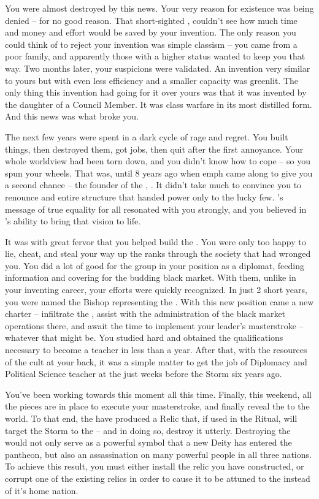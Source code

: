 \documentclass[char]{GL2020}
\begin{document}
You were almost destroyed by this news. Your very reason for existence was being denied -- for no good reason. That short-sighted \cAntiChup{\cleric}, \cAntiChup{} couldn’t see how much time and money and effort would be saved by your invention. The only reason you could think of to reject your invention was simple classism -- you came from a poor family, and apparently those with a higher status wanted to keep you that way. Two months later, your suspicions were validated. An invention very similar to yours but with even less efficiency and a smaller capacity was greenlit. The only thing this invention had going for it over yours was that it was invented by the daughter of a Council Member. It was class warfare in its most distilled form. And this news was what broke you.

The next few years were spent in a dark cycle of rage and regret. You built things, then destroyed them, got jobs, then quit after the first annoyance. Your whole worldview had been torn down, and you didn’t know how to cope -- so you spun your wheels. That was, until 8 years ago when emph{\cChupLeader{\they}} came along to give you a second chance -- the founder of the \pGoaties{}, \cChupLeader{}. It didn’t take much to convince you to renounce \cTechGod{} and \cTechGod{\their} entire structure that handed power only to the lucky few. \cGenesis{}’s message of true equality for all resonated with you strongly, and you believed in \cChupLeader{}’s ability to bring that vision to life. 

It was with great fervor that you helped build the \pGoaties{}. You were only too happy to lie, cheat, and steal your way up the ranks through the society that had wronged you. You did a lot of good for the group in your position as a diplomat, feeding information and covering for the budding black market. With them, unlike in your inventing career, your efforts were quickly recognized. In just 2 short years, you were named the Bishop representing the \pTech{}. With this new position came a new charter -- infiltrate the \pSchool{}, assist with the administration of the black market operations there, and await the time to implement your leader’s masterstroke -- whatever that might be. You studied hard and obtained the qualifications necessary to become a teacher in less than a year. After that, with the resources of the cult at your back, it was a simple matter to get the job of Diplomacy and Political Science teacher at the \pSc{} just weeks before the Storm six years ago.

You’ve been working towards this moment all this time. Finally, this weekend, all the pieces are in place to execute your masterstroke, and finally reveal the \pGoaties{} to the world. To that end, the \pGoaties{} have produced a Relic that, if used in the Ritual, will target the Storm to the \pSchool{} -- and in doing so, destroy it utterly. Destroying the \pSc{} would not only serve as a powerful symbol that a new Deity has entered the pantheon, but also an assassination on many powerful people in all three nations. To achieve this result, you must either install the relic you have constructed, or corrupt one of the existing relics in order to cause it to be attuned to the \pSc{} instead of it’s home nation.
\end{document}
